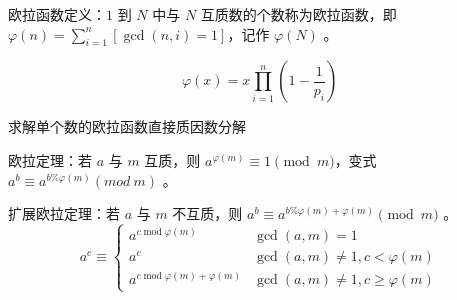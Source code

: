 欧拉函数定义：$1$ 到 $N$ 中与 $N$ 互质数的个数称为欧拉函数，即 $\varphi(n)=\sum_{i=1}^n[\gcd(n,i)=1]$，记作 $\varphi (N)$ 。

$$\varphi(x)=x\prod_{i=1}^n(1-\frac{1}{p_i})$$

求解单个数的欧拉函数直接质因数分解

欧拉定理：若 $a$ 与 $m$ 互质，则 $a^{\varphi(m)}\equiv 1\pmod m$，变式 $a^b≡a^{b\%\varphi(m)}(mod\ m)$ 。

扩展欧拉定理：若 $a$ 与 $m$ 不互质，则 $a^b\equiv a^{b\% \varphi(m)+\varphi(m)}\pmod m$ 。
$$a^c\equiv\left\{\begin{array}{l|l}a^{c\operatorname{mod}\varphi(m)}&\gcd(a,m)=1\\a^c&\gcd(a,m)\neq1,c<\varphi(m)\\a^{c\operatorname{mod}\varphi(m)+\varphi(m)}&\gcd(a,m)\neq1,c\geq\varphi(m)\end{array}\right.$$